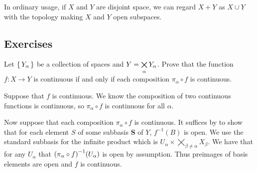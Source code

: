 \documentclass[letterpaper, 11pt, oneside]{book}
\begin{document}
In ordinary usage, if $X$ and $Y$ are disjoint space, we can regard $X + Y$ as $X \cup Y$ with the topology making $X$ and $Y$ open subspaces.

\clearpage

\subsection*{Exercises}

\begin{exercise}\label{exercise: Bredon 1.8.3}
  Let $\set{Y_{\alpha}}$ be a collection of spaces and $Y = \bigtimes\limits_{\alpha} Y_{\alpha}$.
  Prove that the function $f\colon X \to Y$ is continuous if and only if each composition $\pi_{\alpha} \circ f$ is continuous.
\end{exercise}
\begin{pf}
  Suppose that $f$ is continuous.
  We know the composition of two continuous functions is continuous, so $\pi_{\alpha} \circ f$ is continuous for all $\alpha$.

  Now suppose that each composition $\pi_{\alpha} \circ f$ is continuous.
  It suffices by  to show that for each element $S$ of some subbasis \textbf{S} of $Y$, $f^{-1}(B)$ is open.
  We use the standard subbasis for the infinite product which is $U_{\alpha} \times \bigtimes_{\beta \neq \alpha} X_{\beta}$.
  We have that for any $U_{\alpha}$ that $\pqty{\pi_{\alpha} \circ f}^{-1}(U_{\alpha})$ is open by assumption.
  Thus preimages of basis elements are open and $f$ is continuous.
\end{pf}
\end{document}
